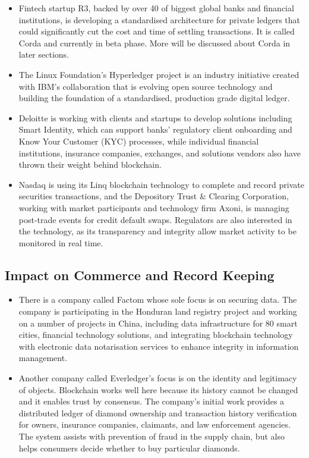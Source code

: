 \begin{itemize}
    \item Fintech startup R3, backed by over 40 of biggest global banks and financial institutions, is developing a standardised architecture for private ledgers that could significantly cut the cost and time of settling transactions\cite{Brown2016Corda:Introduction}. It is called Corda and currently in beta phase. More will be discussed about Corda in later sections.
    \item The Linux Foundation’s Hyperledger project is an industry initiative created with IBM's collaboration that is evolving open source technology and building the foundation of a standardised, production grade digital ledger\cite{IBM2015LinuxTechnology}.
    \item Deloitte is working with clients and startups to develop solutions including Smart Identity, which can support banks’ regulatory client onboarding and Know Your Customer (KYC) processes, while individual financial institutions, insurance companies, exchanges, and solutions vendors also have thrown their weight behind blockchain\cite{Chollet2017DeloitteRelease}.
    \item Nasdaq is using its Linq blockchain technology to complete and record private securities transactions, and the Depository Trust \& Clearing Corporation, working with market participants and technology firm Axoni, is managing post-trade events for credit default swaps. Regulators are also interested in the technology, as its transparency and integrity allow market activity to be monitored in real time\cite{2015NasdaqNASDAQ:NDAQ}. 
\end{itemize}


\subsection{Impact on Commerce and Record Keeping}
\begin{itemize}
    \item There is a company called Factom whose sole focus is on securing data. The company is participating in the Honduran land registry project and working on a number of projects in China, including data infrastructure for 80 smart cities, financial technology solutions, and integrating blockchain technology with electronic data notarisation services to enhance integrity in information management. 
    \item Another company called Everledger’s focus is on the identity and legitimacy of objects. Blockchain works well here because its history cannot be changed and it enables trust by consensus. The company’s initial work provides a distributed ledger of diamond ownership and transaction history verification for owners, insurance companies, claimants, and law enforcement agencies. The system assists with prevention of fraud in the supply chain, but also helps consumers decide whether to buy particular diamonds.
\end{itemize}

